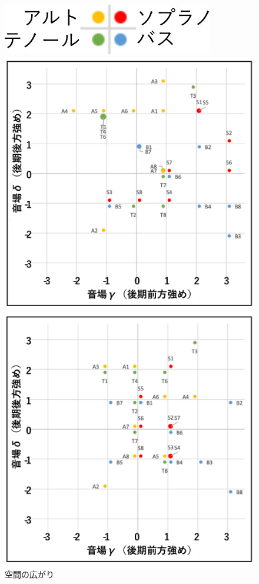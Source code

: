 \documentclass[11pt,a4j]{jreport}
\begin{document}
\begin{figure}[H]
  \begin{minipage}{1\linewidth}
    \centering
    \includegraphics[scale=.7]{images/subjectiveExp/scat_0_legend.jpg}
  \end{minipage}

  \begin{minipage}{0.5\linewidth}
    \centering
    \includegraphics[width=.9\linewidth]{images/subjectiveExp/scat_late_04spacy.pdf}
    \caption*{空間の広がり}
  \end{minipage}%
  \begin{minipage}{0.5\linewidth}
    \centering
    \includegraphics[width=.9\linewidth]{images/subjectiveExp/scat_late_05audience.pdf}

\end{minipage}
\end{figure}
\end{document}
